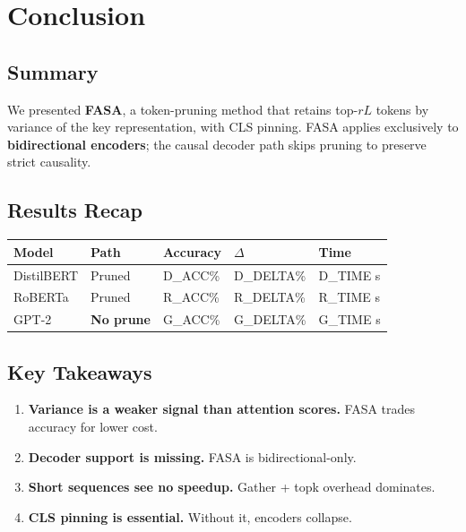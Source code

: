 
\section{Conclusion}

\subsection{Summary}

We presented \textbf{FASA}, a token-pruning method that retains top-$rL$ tokens 
by variance of the key representation, with CLS pinning. FASA applies 
exclusively to \textbf{bidirectional encoders}; the causal decoder path skips 
pruning to preserve strict causality.

\subsection{Results Recap}

\begin{table}[H]
\centering
\small
\begin{tabular}{lllll}
\toprule
\textbf{Model} & \textbf{Path} & \textbf{Accuracy} & \textbf{$\Delta$} & \textbf{Time} \\
\midrule
DistilBERT & Pruned & {{D\_ACC}}\% & {{D\_DELTA}}\% & {{D\_TIME}} s \\
RoBERTa & Pruned & {{R\_ACC}}\% & {{R\_DELTA}}\% & {{R\_TIME}} s \\
GPT-2 & \textbf{No prune} & {{G\_ACC}}\% & {{G\_DELTA}}\% & {{G\_TIME}} s \\
\bottomrule
\end{tabular}
\end{table}

\subsection{Key Takeaways}

\begin{enumerate}
\item \textbf{Variance is a weaker signal than attention scores.} FASA trades
  accuracy for lower cost.
\item \textbf{Decoder support is missing.} FASA is bidirectional-only.
\item \textbf{Short sequences see no speedup.} Gather + topk overhead dominates.
\item \textbf{CLS pinning is essential.} Without it, encoders collapse.

\end{enumerate}
